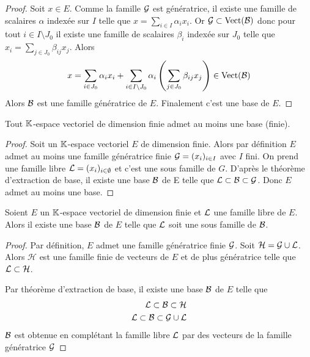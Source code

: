 \begin{proof}
  Soit \(x \in E\). Comme la famille \(\mathcal{G}\) est génératrice, il existe une famille de scalaires \(\alpha\) indexée sur \(I\) telle que \(x = \sum_{i \in I} \alpha_i x_i\). Or \(\mathcal{G} \subset \operatorname{Vect}(\mathcal{B})\) donc pour tout \(i \in I\setminus J_0\) il existe une famille de scalaires \(\beta_i\) indexée sur \(J_0\) telle que \(x_i = \sum_{j \in J_0} \beta_{ij}x_j\). Alors
  \begin{equation}
    x= \sum_{i \in J_0} \alpha_i x_i + \sum_{i \in I\setminus J_0} \alpha_i \left(\sum_{j \in J_0} \beta_{ij}x_j \right) \in \operatorname{Vect}(\mathcal{B})
  \end{equation}
  Alors \(\mathcal{B}\) est une famille génératrice de \(E\). Finalement c'est une base de \(E\).
\end{proof}

\begin{theo}
  Tout \(\mathbb{K}\)-espace vectoriel de dimension finie admet au moins une base (finie).
\end{theo}
\begin{proof}
  Soit un \(\mathbb{K}\)-espace vectoriel \(E\) de dimension finie. Alors par définition \(E\) admet au moins une famille génératrice finie \(\mathcal{G}=(x_i)_{i \in I}\) avec \(I\) fini. On prend une famille libre \(\mathcal{L}=(x_i)_{i \in \emptyset}\) et c'est une sous famille de \(G\). D'après le théorème d'extraction de base, il existe une base \(\mathcal{B}\) de E telle que \(\mathcal{L} \subset \mathcal{B} \subset \mathcal{G}\). Donc \(E\) admet au moins une base.
\end{proof}

\begin{theo}
    \label{theo:baseincomplete}
  Soient \(E\) un \(\mathbb{K}\)-espace vectoriel de dimension finie et \(\mathcal{L}\) une famille libre de \(E\). Alors il existe une base \(\mathcal{B}\) de \(E\) telle que \(\mathcal{L}\) soit une sous famille de \(\mathcal{B}\).
\end{theo}
\begin{proof}
  Par définition, \(E\) admet une famille génératrice finie \(\mathcal{G}\). Soit \(\mathcal{H}=\mathcal{G} \cup \mathcal{L}\). Alors \(\mathcal{H}\) est une famille finie de vecteurs de \(E\) et de plus génératrice telle que \(\mathcal{L} \subset \mathcal{H}\).

  Par théorème d'extraction de base, il existe une base \(\mathcal{B}\) de \(E\) telle que
  \begin{align}
    \mathcal{L} \subset \mathcal{B} \subset \mathcal{H} \\
    \mathcal{L} \subset \mathcal{B} \subset \mathcal{G} \cup \mathcal{L}
  \end{align}
  \(\mathcal{B}\) est obtenue en complétant la famille libre \(\mathcal{L}\) par des vecteurs de la famille génératrice \(\mathcal{G}\)
\end{proof}

